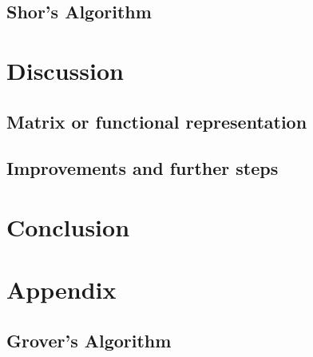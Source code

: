 \documentclass[bibliography=totocnumbered, 10pt]{article}
\theoremstyle{NoticeStyle}
\begin{document}
\subsection{Shor's Algorithm}\label{sec:Shor}


%
\section{Discussion}\label{sec:Discussion}

\subsection{Matrix or functional representation}

\subsection{Improvements and further steps}

%
\section{Conclusion}


%
\section{Appendix}

\subsection{Grover's Algorithm}
\end{document}
